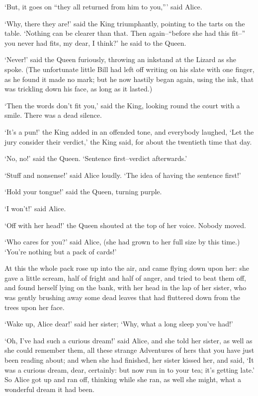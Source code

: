\documentclass[statementpaper,twoside,openany]{memoir}
\begin{document}
`But, it goes on ``they all returned from him to you,''' said Alice.

`Why, there they are!' said the King triumphantly, pointing to the tarts on the table. `Nothing can be clearer than that. Then again--``before she had this fit--'' you never had fits, my dear, I think?' he said to the Queen.

`Never!' said the Queen furiously, throwing an inkstand at the Lizard as she spoke. (The unfortunate little Bill had left off writing on his slate with one finger, as he found it made no mark; but he now hastily began again, using the ink, that was trickling down his face, as long as it lasted.)

`Then the words don't fit you,' said the King, looking round the court with a smile. There was a dead silence.

`It's a pun!' the King added in an offended tone, and everybody laughed, `Let the jury consider their verdict,' the King said, for about the twentieth time that day.

`No, no!' said the Queen. `Sentence first--verdict afterwards.'

`Stuff and nonsense!' said Alice loudly. `The idea of having the sentence first!'

`Hold your tongue!' said the Queen, turning purple.

`I won't!' said Alice.

`Off with her head!' the Queen shouted at the top of her voice. Nobody moved.

`Who cares for you?' said Alice, (she had grown to her full size by this time.) `You're nothing but a pack of cards!'

At this the whole pack rose up into the air, and came flying down upon her: she gave a little scream, half of fright and half of anger, and tried to beat them off, and found herself lying on the bank, with her head in the lap of her sister, who was gently brushing away some dead leaves that had fluttered down from the trees upon her face.

`Wake up, Alice dear!' said her sister; `Why, what a long sleep you've had!'

`Oh, I've had such a curious dream!' said Alice, and she told her sister, as well as she could remember them, all these strange Adventures of hers that you have just been reading about; and when she had finished, her sister kissed her, and said, `It was a curious dream, dear, certainly: but now run in to your tea; it's getting late.' So Alice got up and ran off, thinking while she ran, as well she might, what a wonderful dream it had been.
\end{document}
